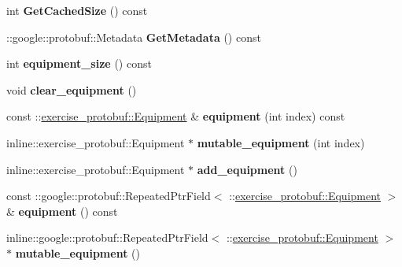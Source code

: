 \begin{DoxyCompactItemize}
\item 
\hypertarget{classexercise__protobuf_1_1_gym_a48ffc8148ee8dae3cf0c6dc30c84bd55}{}int {\bfseries Get\+Cached\+Size} () const \label{classexercise__protobuf_1_1_gym_a48ffc8148ee8dae3cf0c6dc30c84bd55}

\item 
\hypertarget{classexercise__protobuf_1_1_gym_a4760b64829ff017c841ce2ee358c2d01}{}\+::google\+::protobuf\+::\+Metadata {\bfseries Get\+Metadata} () const \label{classexercise__protobuf_1_1_gym_a4760b64829ff017c841ce2ee358c2d01}

\item 
\hypertarget{classexercise__protobuf_1_1_gym_a27a4f396faff45ce740c2e97fc607af4}{}int {\bfseries equipment\+\_\+size} () const \label{classexercise__protobuf_1_1_gym_a27a4f396faff45ce740c2e97fc607af4}

\item 
\hypertarget{classexercise__protobuf_1_1_gym_a39fd155db773fdeeb782acac7fc540e0}{}void {\bfseries clear\+\_\+equipment} ()\label{classexercise__protobuf_1_1_gym_a39fd155db773fdeeb782acac7fc540e0}

\item 
\hypertarget{classexercise__protobuf_1_1_gym_abf15a9b9acc08a0404fe4c8f0c0b1992}{}const \+::\hyperlink{classexercise__protobuf_1_1_equipment}{exercise\+\_\+protobuf\+::\+Equipment} \& {\bfseries equipment} (int index) const \label{classexercise__protobuf_1_1_gym_abf15a9b9acc08a0404fe4c8f0c0b1992}

\item 
\hypertarget{classexercise__protobuf_1_1_gym_aa5082078c89fd294ea528c85068fab44}{}inline\+::exercise\+\_\+protobuf\+::\+Equipment $\ast$ {\bfseries mutable\+\_\+equipment} (int index)\label{classexercise__protobuf_1_1_gym_aa5082078c89fd294ea528c85068fab44}

\item 
\hypertarget{classexercise__protobuf_1_1_gym_a627f83620cd7153b868239224731a1ee}{}inline\+::exercise\+\_\+protobuf\+::\+Equipment $\ast$ {\bfseries add\+\_\+equipment} ()\label{classexercise__protobuf_1_1_gym_a627f83620cd7153b868239224731a1ee}

\item 
\hypertarget{classexercise__protobuf_1_1_gym_a8e34caf50624d20ec7842667c094ec84}{}const \+::google\+::protobuf\+::\+Repeated\+Ptr\+Field$<$ \+::\hyperlink{classexercise__protobuf_1_1_equipment}{exercise\+\_\+protobuf\+::\+Equipment} $>$ \& {\bfseries equipment} () const \label{classexercise__protobuf_1_1_gym_a8e34caf50624d20ec7842667c094ec84}

\item 
\hypertarget{classexercise__protobuf_1_1_gym_a69c1805ad995d89710319b12efd1cf94}{}inline\+::google\+::protobuf\+::\+Repeated\+Ptr\+Field$<$ \+::\hyperlink{classexercise__protobuf_1_1_equipment}{exercise\+\_\+protobuf\+::\+Equipment} $>$ $\ast$ {\bfseries mutable\+\_\+equipment} ()\label{classexercise__protobuf_1_1_gym_a69c1805ad995d89710319b12efd1cf94}

\end{DoxyCompactItemize}
